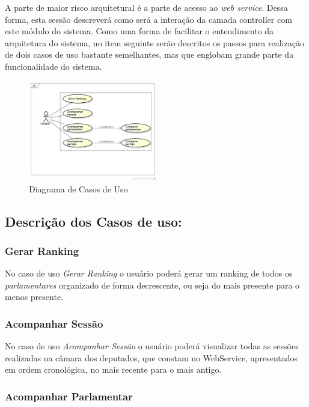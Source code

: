 A parte de maior risco arquitetural é a parte de acesso ao \textit{web service}. Dessa forma, esta sessão descreverá como será a interação da camada controller com este módulo do sistema. Como uma forma de facilitar o entendimento da arquitetura do sistema, no item seguinte serão descritos os passos para realização de dois casos de uso bastante semelhantes, mas que englobam grande parte da funcionalidade do sistema.

\begin{figure}[H]
	\centering
	\includegraphics[width=0.5\textwidth]{conteudo/diagrama_caso_de_uso}
	\caption{Diagrama de Casos de Uso}
	\label{img:diagrama_arquitetura}
\end{figure}

\subsection{Descrição dos Casos de uso:}
	
	\subsubsection{Gerar Ranking}

	No caso de uso \textit{Gerar Ranking} o usuário poderá gerar um ranking de todos os \textit{parlamentares} organizado de forma decrescente, ou seja do mais presente para o menos presente.

	\subsubsection{Acompanhar Sessão}

	No caso de uso \textit{Acompanhar Sessão} o usuário poderá visualizar todas as sessões realizadas na câmara dos deputados, que constam no WebService, apresentados em ordem cronológica, no mais recente para o mais antigo.

	\subsubsection{Acompanhar Parlamentar}

